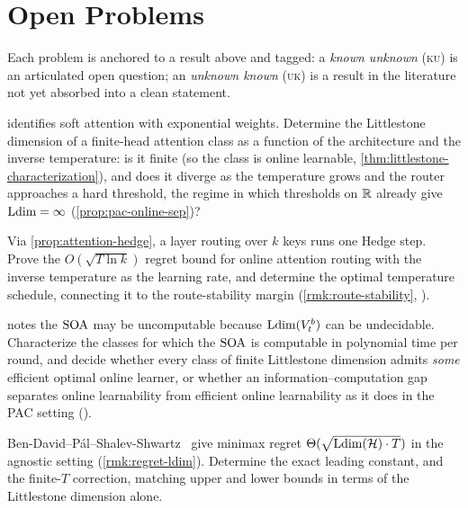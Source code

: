\section{Open Problems}
\label{sec:ch6-open}

Each problem is anchored to a result above and tagged: a \emph{known unknown} (\textsc{ku}) is an articulated open question; an \emph{unknown known} (\textsc{uk}) is a result in the literature not yet absorbed into a clean statement.

\begin{openprob}
\label{op:ldim-attention}
 identifies soft attention with exponential weights.  Determine the Littlestone dimension of a finite-head attention class as a function of the architecture and the inverse temperature: is it finite (so the class is online learnable, \cref{thm:littlestone-characterization}), and does it diverge as the temperature grows and the router approaches a hard threshold, the regime in which thresholds on $\mathbb{R}$ already give $\mathrm{Ldim} = \infty$ (\cref{prop:pac-online-sep})?
\end{openprob}

\begin{openprob}
\label{op:attention-regret}
Via \cref{prop:attention-hedge}, a layer routing over $k$ keys runs one Hedge step.  Prove the $O(\sqrt{T \ln k})$ regret bound for online attention routing with the inverse temperature as the learning rate, and determine the optimal temperature schedule, connecting it to the route-stability margin (\cref{rmk:route-stability}, ).
\end{openprob}

\begin{openprob}
\label{op:soa-computable}
 notes the $\mathrm{SOA}$ may be uncomputable because $\mathrm{Ldim}(V_t^b)$ can be undecidable.  Characterize the classes for which the $\mathrm{SOA}$ is computable in polynomial time per round, and decide whether every class of finite Littlestone dimension admits \emph{some} efficient optimal online learner, or whether an information--computation gap separates online learnability from efficient online learnability as it does in the PAC setting ().
\end{openprob}

\begin{openprob}
\label{op:regret-constant}
Ben-David--P\'al--Shalev-Shwartz~\cite{BenDavidPalShalevShwartz2009} give minimax regret $\Theta(\sqrt{\mathrm{Ldim}(\mathcal{H}) \cdot T})$ in the agnostic setting (\cref{rmk:regret-ldim}).  Determine the exact leading constant, and the finite-$T$ correction, matching upper and lower bounds in terms of the Littlestone dimension alone.
\end{openprob}

